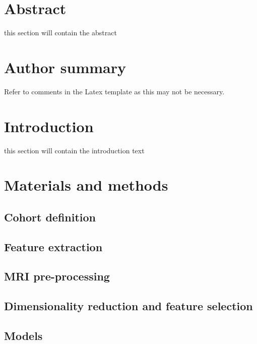 \documentclass[10pt,letterpaper]{article}
\begin{document}
\section*{Abstract}
this section will contain the abstract

\section*{Author summary}
Refer to comments in the Latex template as this may not be necessary.

\linenumbers

\section*{Introduction}
this section will contain the introduction text

\section*{Materials and methods}

\subsection*{Cohort definition}


\subsection*{Feature extraction}


\subsection*{MRI pre-processing}


\subsection*{Dimensionality reduction and feature selection}


\subsection*{Models}

\end{document}
